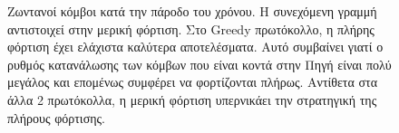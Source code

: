 \begin{figure}[H]
  \centering
  \caption{Ζωντανοί κόμβοι κατά την πάροδο του χρόνου. Η συνεχόμενη γραμμή αντιστοιχεί στην μερική φόρτιση. Στο Greedy πρωτόκολλο, η πλήρης φόρτιση έχει
ελάχιστα καλύτερα αποτελέσματα. Αυτό συμβαίνει γιατί ο ρυθμός κατανάλωσης των κόμβων που είναι κοντά στην Πηγή είναι πολύ μεγάλος και επομένως συμφέρει να φορτίζονται
πλήρως. Αντίθετα στα άλλα 2 πρωτόκολλα, η μερική φόρτιση
υπερνικάει την στρατηγική της πλήρους φόρτισης.}
  \label{fig:2exp_1_1}
\end{figure}

